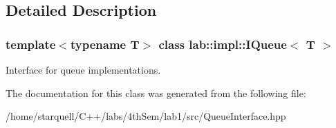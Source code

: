 \subsection{Detailed Description}
\subsubsection*{template$<$typename T$>$\newline
class lab\+::impl\+::\+I\+Queue$<$ T $>$}

Interface for queue implementations. 

The documentation for this class was generated from the following file\+:\begin{DoxyCompactItemize}
\item 
/home/starquell/\+C++/labs/4th\+Sem/lab1/src/Queue\+Interface.\+hpp\end{DoxyCompactItemize}

